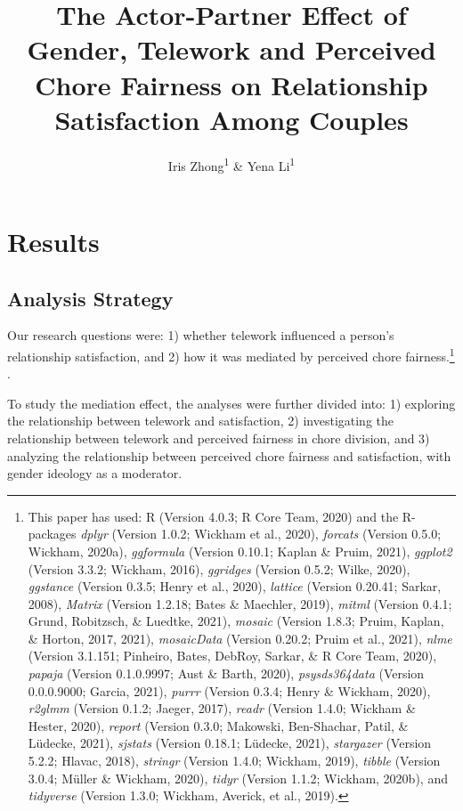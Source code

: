\documentclass[
  english,
  man]{apa6}
\title{The Actor-Partner Effect of Gender, Telework and Perceived Chore Fairness on Relationship Satisfaction Among Couples}
\author{Iris Zhong\textsuperscript{1} \& Yena Li\textsuperscript{1}}
\date{}
\affiliation{\vspace{0.5cm}\textsuperscript{1} Smith College}
\begin{document}
\maketitle

\hypertarget{results}{%
\section{Results}\label{results}}

\hypertarget{analysis-strategy}{%
\subsection{Analysis Strategy}\label{analysis-strategy}}

Our research questions were: 1) whether telework influenced a person's relationship satisfaction, and 2) how it was mediated by perceived chore fairness.\footnote{This paper has used: R (Version 4.0.3; R Core Team, 2020) and the R-packages \emph{dplyr} (Version 1.0.2; Wickham et al., 2020), \emph{forcats} (Version 0.5.0; Wickham, 2020a), \emph{ggformula} (Version 0.10.1; Kaplan \& Pruim, 2021), \emph{ggplot2} (Version 3.3.2; Wickham, 2016), \emph{ggridges} (Version 0.5.2; Wilke, 2020), \emph{ggstance} (Version 0.3.5; Henry et al., 2020), \emph{lattice} (Version 0.20.41; Sarkar, 2008), \emph{Matrix} (Version 1.2.18; Bates \& Maechler, 2019), \emph{mitml} (Version 0.4.1; Grund, Robitzsch, \& Luedtke, 2021), \emph{mosaic} (Version 1.8.3; Pruim, Kaplan, \& Horton, 2017, 2021), \emph{mosaicData} (Version 0.20.2; Pruim et al., 2021), \emph{nlme} (Version 3.1.151; Pinheiro, Bates, DebRoy, Sarkar, \& R Core Team, 2020), \emph{papaja} (Version 0.1.0.9997; Aust \& Barth, 2020), \emph{psysds364data} (Version 0.0.0.9000; Garcia, 2021), \emph{purrr} (Version 0.3.4; Henry \& Wickham, 2020), \emph{r2glmm} (Version 0.1.2; Jaeger, 2017), \emph{readr} (Version 1.4.0; Wickham \& Hester, 2020), \emph{report} (Version 0.3.0; Makowski, Ben-Shachar, Patil, \& Lüdecke, 2021), \emph{sjstats} (Version 0.18.1; Lüdecke, 2021), \emph{stargazer} (Version 5.2.2; Hlavac, 2018), \emph{stringr} (Version 1.4.0; Wickham, 2019), \emph{tibble} (Version 3.0.4; Müller \& Wickham, 2020), \emph{tidyr} (Version 1.1.2; Wickham, 2020b), and \emph{tidyverse} (Version 1.3.0; Wickham, Averick, et al., 2019).}
.

To study the mediation effect, the analyses were further divided into: 1) exploring the relationship between telework and satisfaction, 2) investigating the relationship between telework and perceived fairness in chore division, and 3) analyzing the relationship between perceived chore fairness and satisfaction, with gender ideology as a moderator.
\end{document}

